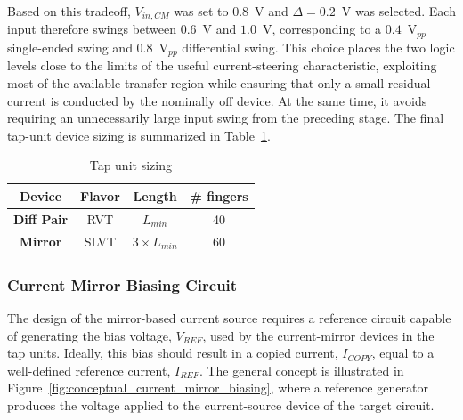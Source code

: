 Based on this tradeoff, $V_{in,CM}$ was set to $0.8$~V and $\Delta=0.2$~V was selected. Each input therefore swings between $0.6$~V and $1.0$~V, corresponding to a $0.4$~V$_{pp}$ single-ended swing and $0.8$~V$_{pp}$ differential swing. This choice places the two logic levels close to the limits of the useful current-steering characteristic, exploiting most of the available transfer region while ensuring that only a small residual current is conducted by the nominally off device. At the same time, it avoids requiring an unnecessarily large input swing from the preceding stage. The final tap-unit device sizing is summarized in Table~\ref{tab:tap_unit_final_sizing}.

\begin{table}[H]
	\centering
	\caption{Tap unit sizing}\label{tab:tap_unit_final_sizing}
	\begin{tabular}{cccc}
		\hline \hline	
		\textbf{Device} 	& \textbf{Flavor} 	& \textbf{Length} 	& \textbf{\# fingers}\\
		\hline
		\textbf{Diff Pair} 	& RVT 				& $L_{min}$ 		& 40\\
		\textbf{Mirror} 	& SLVT 				& $3\times L_{min}$ & 60\\
		\hline \hline
	\end{tabular}
\end{table}




\subsubsection{Current Mirror Biasing Circuit}\label{sec:mirror_ref_dev}

The design of the mirror-based current source requires a reference circuit capable of generating the bias voltage, $V_{REF}$, used by the current-mirror devices in the tap units. Ideally, this bias should result in a copied current, $I_{COPY}$, equal to a well-defined reference current, $I_{REF}$. The general concept is illustrated in Figure~\ref{fig:conceptual_current_mirror_biasing}, where a reference generator produces the voltage applied to the current-source device of the target circuit.


